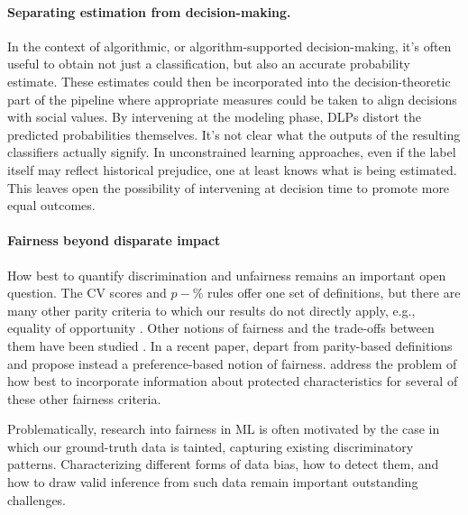 \paragraph{Separating estimation from decision-making.}
In the context of algorithmic, 
or algorithm-supported decision-making, 
it's often useful to obtain not just a classification, 
but also an accurate probability estimate.  
These estimates could then be incorporated 
into the decision-theoretic part of the pipeline 
where appropriate measures could be taken to
align decisions with social values.   
By intervening at the modeling phase, 
DLPs distort the predicted probabilities themselves.  
It's not clear what the outputs of 
the resulting classifiers actually signify.
In unconstrained learning approaches, 
even if the label itself 
may reflect historical prejudice, 
one at least knows 
what is being estimated. 
This leaves open the possibility of intervening at decision time to promote more equal outcomes.  

\vspace{-2mm}

\paragraph{Fairness beyond disparate impact}
How best to quantify discrimination and unfairness 
remains an important open question.  
The CV scores and $p-\%$ rules 
offer one set of definitions,
but there are many other parity criteria
to which our results do not directly apply,
e.g., equality of opportunity \cite{hardt2016equality}.
Other  notions of fairness and the trade-offs between them 
have been studied \citep{joseph2016rawlsian,kleinberg2016inherent,chouldechova2017fairlong,berk2017fairness,ritov2017conditional}.  
In a recent paper, \citet{zafar2017parity} 
depart from parity-based definitions 
and propose instead a preference-based notion of fairness. \citet{dwork2017decoupled} address the problem 
of how best to incorporate information 
about protected characteristics 
for several of these other fairness criteria.

Problematically, research into fairness in ML 
is often motivated by the case 
in which our ground-truth data is tainted,
capturing existing discriminatory patterns.  
Characterizing different forms of data bias, how to detect them, and how to draw valid inference from such data
remain important outstanding challenges.


